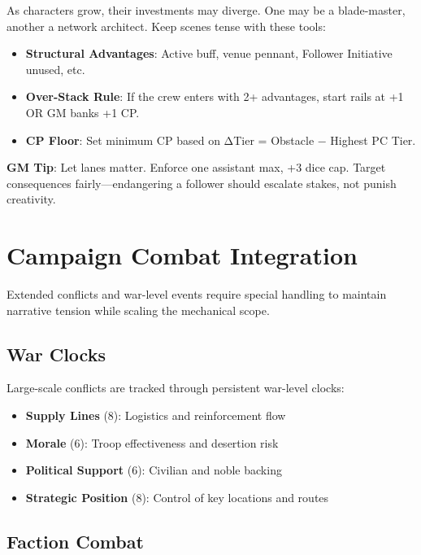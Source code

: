 As characters grow, their investments may diverge. One may be a blade-master, another a network architect. Keep scenes tense with these tools:

\begin{itemize}
    \item \textbf{Structural Advantages}: Active buff, venue pennant, Follower Initiative unused, etc.
    \item \textbf{Over-Stack Rule}: If the crew enters with 2+ advantages, start rails at +1 OR GM banks +1 CP.
    \item \textbf{CP Floor}: Set minimum CP based on ΔTier = Obstacle − Highest PC Tier.
\end{itemize}

\textbf{GM Tip}: Let lanes matter. Enforce one assistant max, +3 dice cap. Target consequences fairly---endangering a follower should escalate stakes, not punish creativity.

\section*{Campaign Combat Integration}

Extended conflicts and war-level events require special handling to maintain narrative tension while scaling the mechanical scope.

\subsection*{War Clocks}

Large-scale conflicts are tracked through persistent war-level clocks:

\begin{itemize}
    \item \textbf{Supply Lines} (8): Logistics and reinforcement flow
    \item \textbf{Morale} (6): Troop effectiveness and desertion risk
    \item \textbf{Political Support} (6): Civilian and noble backing
    \item \textbf{Strategic Position} (8): Control of key locations and routes
\end{itemize}

\subsection*{Faction Combat}

